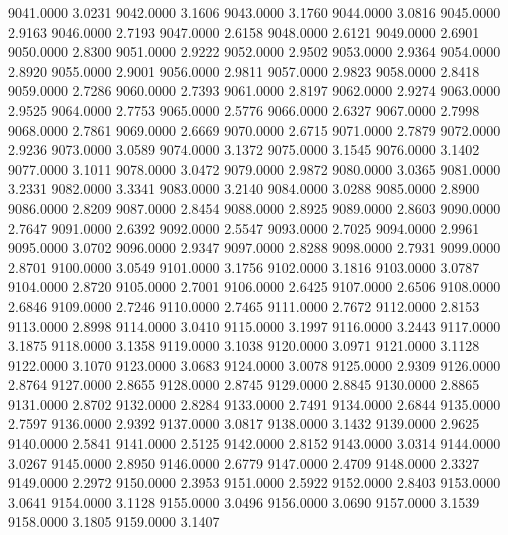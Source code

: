 9041.0000      3.0231
9042.0000      3.1606
9043.0000      3.1760
9044.0000      3.0816
9045.0000      2.9163
9046.0000      2.7193
9047.0000      2.6158
9048.0000      2.6121
9049.0000      2.6901
9050.0000      2.8300
9051.0000      2.9222
9052.0000      2.9502
9053.0000      2.9364
9054.0000      2.8920
9055.0000      2.9001
9056.0000      2.9811
9057.0000      2.9823
9058.0000      2.8418
9059.0000      2.7286
9060.0000      2.7393
9061.0000      2.8197
9062.0000      2.9274
9063.0000      2.9525
9064.0000      2.7753
9065.0000      2.5776
9066.0000      2.6327
9067.0000      2.7998
9068.0000      2.7861
9069.0000      2.6669
9070.0000      2.6715
9071.0000      2.7879
9072.0000      2.9236
9073.0000      3.0589
9074.0000      3.1372
9075.0000      3.1545
9076.0000      3.1402
9077.0000      3.1011
9078.0000      3.0472
9079.0000      2.9872
9080.0000      3.0365
9081.0000      3.2331
9082.0000      3.3341
9083.0000      3.2140
9084.0000      3.0288
9085.0000      2.8900
9086.0000      2.8209
9087.0000      2.8454
9088.0000      2.8925
9089.0000      2.8603
9090.0000      2.7647
9091.0000      2.6392
9092.0000      2.5547
9093.0000      2.7025
9094.0000      2.9961
9095.0000      3.0702
9096.0000      2.9347
9097.0000      2.8288
9098.0000      2.7931
9099.0000      2.8701
9100.0000      3.0549
9101.0000      3.1756
9102.0000      3.1816
9103.0000      3.0787
9104.0000      2.8720
9105.0000      2.7001
9106.0000      2.6425
9107.0000      2.6506
9108.0000      2.6846
9109.0000      2.7246
9110.0000      2.7465
9111.0000      2.7672
9112.0000      2.8153
9113.0000      2.8998
9114.0000      3.0410
9115.0000      3.1997
9116.0000      3.2443
9117.0000      3.1875
9118.0000      3.1358
9119.0000      3.1038
9120.0000      3.0971
9121.0000      3.1128
9122.0000      3.1070
9123.0000      3.0683
9124.0000      3.0078
9125.0000      2.9309
9126.0000      2.8764
9127.0000      2.8655
9128.0000      2.8745
9129.0000      2.8845
9130.0000      2.8865
9131.0000      2.8702
9132.0000      2.8284
9133.0000      2.7491
9134.0000      2.6844
9135.0000      2.7597
9136.0000      2.9392
9137.0000      3.0817
9138.0000      3.1432
9139.0000      2.9625
9140.0000      2.5841
9141.0000      2.5125
9142.0000      2.8152
9143.0000      3.0314
9144.0000      3.0267
9145.0000      2.8950
9146.0000      2.6779
9147.0000      2.4709
9148.0000      2.3327
9149.0000      2.2972
9150.0000      2.3953
9151.0000      2.5922
9152.0000      2.8403
9153.0000      3.0641
9154.0000      3.1128
9155.0000      3.0496
9156.0000      3.0690
9157.0000      3.1539
9158.0000      3.1805
9159.0000      3.1407
